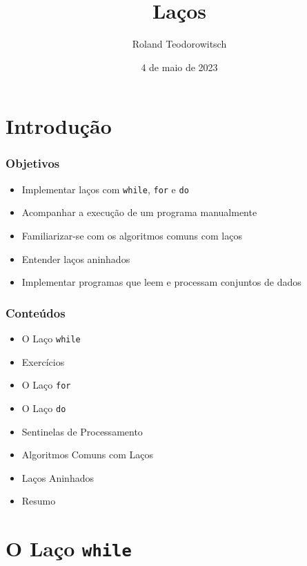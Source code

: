 \documentclass[xcolor={dvipsnames,table},aspectratio=169]{beamer}
\title[\sc{Laços}]{Laços}
\author[Roland Teodorowitsch]{Roland Teodorowitsch}
\institute[FPROG - EP - PUCRS]{Fundamentos de Programação - Escola Politécnica - PUCRS}
\date{4 de maio de 2023}
\begin{document}
\justifying

\begin{frame}
	\titlepage
\end{frame}

\section{Introdução}

\begin{frame}\frametitle{Objetivos}
\begin{itemize}
	\item Implementar laços com \texttt{while}, \texttt{for} e \texttt{do}
	\item Acompanhar a execução de um programa manualmente
	\item Familiarizar-se com os algoritmos comuns com laços
	\item Entender laços aninhados
	\item Implementar programas que leem e processam conjuntos de dados
\end{itemize}
\end{frame}

\begin{frame}\frametitle{Conteúdos}
\begin{itemize}
	\item O Laço \texttt{while}
	\item Exercícios
	\item O Laço \texttt{for}
	\item O Laço \texttt{do}
	\item Sentinelas de Processamento
	\item Algoritmos Comuns com Laços
	\item Laços Aninhados
	\item Resumo
\end{itemize}
\end{frame}

\section{O Laço \texttt{while}}
\end{document}
